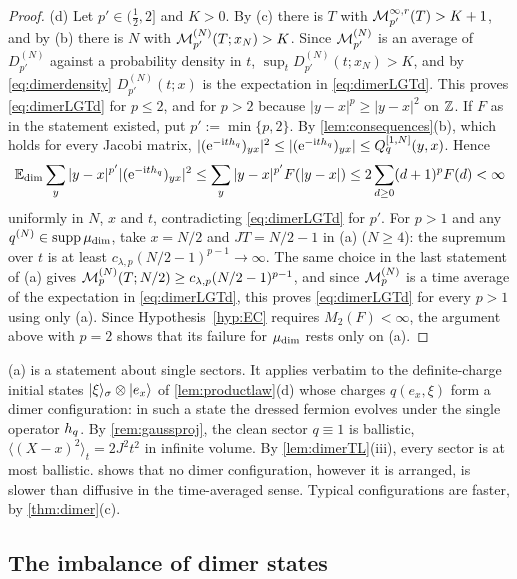 \begin{proof}
(d) Let $p'\in(\frac12,2]$ and $K>0$.  By (c) there is $T$ with $\mathcal{M}^{\infty,r}_{p'}(T)>K+1$, and by
(b) there is $N$ with $\mathcal{M}^{(N)}_{p'}(T;x_N)>K$.  Since $\mathcal{M}^{(N)}_{p'}$ is an average of
$D^{(N)}_{p'}$ against a probability density in $t$, $\sup_tD^{(N)}_{p'}(t;x_N)>K$, and by
\eqref{eq:dimerdensity} $D^{(N)}_{p'}(t;x)$ is the expectation in \eqref{eq:dimerLGTd}.  This proves
\eqref{eq:dimerLGTd} for $p\le2$, and for $p>2$ because $|y-x|^p\ge|y-x|^2$ on $\mathbb{Z}$.  If $F$ as in the
statement existed, put $p':=\min\{p,2\}$.  By \cref{lem:consequences}(b), which holds for every
Jacobi matrix, $|(\mathrm{e}^{-\mathrm{i} th_{q}})_{yx}|^2\le|(\mathrm{e}^{-\mathrm{i} th_{q}})_{yx}|\le Q^{[1,N]}_q(y,x)$.  Hence
\[
  \mathbb{E}_{\mathrm{dim}}\sum_y|y-x|^{p'}|(\mathrm{e}^{-\mathrm{i} th_{q}})_{yx}|^2\le\sum_y|y-x|^{p'}F(|y-x|)\le2\sum_{d\ge0}(d+1)^pF(d)<\infty
\]
uniformly in $N$, $x$ and $t$, contradicting \eqref{eq:dimerLGTd} for $p'$.  For $p>1$ and any
$q^{(N)}\in\operatorname{supp}\mu_{\mathrm{dim}}$, take $x=N/2$ and $JT=N/2-1$ in (a) ($N\ge4$): the supremum over $t$ is at least
$c_{\lambda,p}(N/2-1)^{p-1}\to\infty$.  The same choice in the last statement of (a) gives
$\mathcal{M}^{(N)}_p(T;N/2)\ge c_{\lambda,p}(N/2-1)^{p-1}$, and since $\mathcal{M}^{(N)}_p$ is a time average of the
expectation in \eqref{eq:dimerLGTd}, this proves \eqref{eq:dimerLGTd} for every $p>1$ using only (a).  Since Hypothesis~\ref{hyp:EC} requires $M_2(F)<\infty$, the
argument above with $p=2$ shows that its failure for $\mu_{\mathrm{dim}}$ rests only on (a).
\end{proof}

\begin{remark}\label{rem:dimersingle}
(a) is a statement about single sectors.  It applies verbatim to the definite-charge
initial states $|\xi\rangle_\sigma\otimes|e_x\rangle$ of \cref{lem:productlaw}(d) whose charges
$q(e_x,\xi)$ form a dimer configuration: in such a state the dressed fermion evolves under the single
operator $h_{q}$.  By \cref{rem:gaussproj}, the clean sector $q\equiv1$ is ballistic,
$\langle(X-x)^2\rangle_t=2J^2t^2$ in infinite volume.  By \cref{lem:dimerTL}(iii), every sector is at
most ballistic.   shows that no dimer configuration, however it is arranged, is
slower than diffusive in the time-averaged sense.  Typical configurations are faster, by
\cref{thm:dimer}(c).
\end{remark}

\subsection{The imbalance of dimer states}\label{sec:dimer:imbalance}


